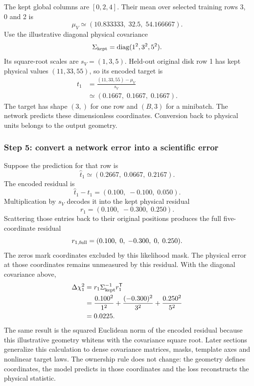 \documentclass[10pt,aps,prd,twocolumn,nofootinbib]{revtex4-2}
\begin{document}
The kept global columns are $[0,2,4]$.  Their mean over selected training rows
3, 0 and 2 is
\begin{equation*}
 \mu_V\simeq(10.833333,\;32.5,\;54.166667).
\end{equation*}
Use the illustrative diagonal physical covariance
\begin{equation*}
 \Sigma_{\rm kept}=\operatorname{diag}(1^2,3^2,5^2).
\end{equation*}
Its square-root scales are $s_V=(1,3,5)$.  Held-out original disk row 1 has kept
physical values $(11,33,55)$, so its encoded target is
\begin{align*}
 t_1
 &=\frac{(11,33,55)-\mu_V}{s_V}\\
 &\simeq(0.1667,\;0.1667,\;0.1667).
\end{align*}
The target has shape $(3,)$ for one row and $(B,3)$ for a minibatch.  The
network predicts these dimensionless coordinates.  Conversion back to
physical units belongs to the output geometry.

\subsubsection{Step 5: convert a network error into a scientific error}

Suppose the prediction for that row is
\begin{equation*}
 \widehat t_1\simeq(0.2667,\;0.0667,\;0.2167).
\end{equation*}
The encoded residual is
\begin{equation*}
 \widehat t_1-t_1=(0.100,\;-0.100,\;0.050).
\end{equation*}
Multiplication by $s_V$ decodes it into the kept physical residual
\begin{equation*}
 r_1=(0.100,\;-0.300,\;0.250).
\end{equation*}
Scattering those entries back to their original positions produces the full
five-coordinate residual
\begin{equation*}
 r_{1,\rm full}=(0.100,\;0,\;-0.300,\;0,\;0.250).
\end{equation*}
The zeros mark coordinates excluded by this likelihood mask.  The physical
error at those coordinates remains unmeasured by this residual.  With the
diagonal covariance above,
\begin{align*}
 \Delta\chi_1^2
 &=r_1\Sigma_{\rm kept}^{-1}r_1^{\mathsf T}\\
 &=\frac{0.100^2}{1^2}
   +\frac{(-0.300)^2}{3^2}
   +\frac{0.250^2}{5^2}\\
 &=0.0225.
\end{align*}
The same result is the squared Euclidean norm of the encoded residual because
this illustrative geometry whitens with the covariance square root.  Later
sections generalize this calculation to dense covariance matrices, masks,
template axes and nonlinear target laws.  The ownership rule does not
change: the geometry defines coordinates, the model predicts in those
coordinates and the loss reconstructs the physical statistic.
\end{document}

